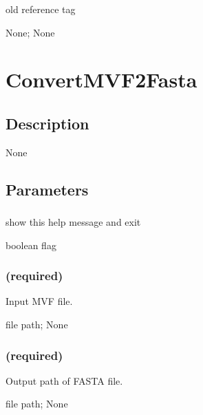 \documentclass[letterpaper,11pt,english]{sphinxmanual}
\begin{document}
\subsubsection{}
\label{\detokenize{prog_desc:ref-tag-reftag}}
 old reference tag

 None;  None


\section{ConvertMVF2Fasta}
\label{\detokenize{prog_desc:convertmvf2fasta}}

\subsection{Description}
\label{\detokenize{prog_desc:id13}}
None


\subsection{Parameters}
\label{\detokenize{prog_desc:id14}}

\subsubsection{}
\label{\detokenize{prog_desc:id15}}
 show this help message and exit

 boolean flag


\subsubsection{ (required)}
\label{\detokenize{prog_desc:id16}}
 Input MVF file.

 file path;  None


\subsubsection{ (required)}
\label{\detokenize{prog_desc:id17}}
 Output path of FASTA file.

 file path;  None
\end{document}
